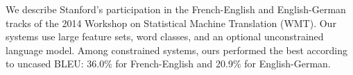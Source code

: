 We describe Stanford's participation in the French-English and English-German tracks of the 2014 Workshop on Statistical Machine Translation (WMT).  Our systems use large feature sets, word classes, and an optional unconstrained language model.  Among constrained systems, ours performed the best according to uncased BLEU: 36.0\% for French-English and 20.9\% for English-German.
